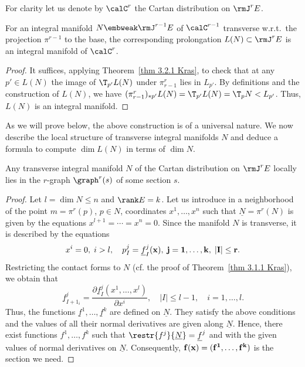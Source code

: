 For clarity let us denote by $\calC^r$ the Cartan distribution on $\rmJ^r E$.

\begin{cor}
    For an integral manifold $N\embweak\rmJ^{r-1}E$ of $\calC^{r-1}$ transverse w.r.t.\ the projection $\pi^{r-1}$ to the base, the corresponding prolongation $L(N)\subset \rmJ^rE$ is an integral manifold of $\calC^r$.
\end{cor}
\begin{proof}
    It suffices, applying Theorem~\ref{thm 3.2.1 Kras}, to check that at any $p'\in L(N)$ the image of $\T_{p'}L(N)$ under $\pi^r_{r-1}$ lies in $L_{p'}$. By definitions and the construction of $L(N)$, we have $(\pi^r_{r-1})_{\ast p'}L(N)=\T_{p'}L(N)=\T_pN< L_{p'}$. Thus, $L(N)$ is an integral manifold.
\end{proof}

As we will prove below, the above construction is of a universal nature. We now describe the local structure of transverse integral manifolds $N$ and deduce a formula to compute $\dim L(N)$ in terms of $\dim N$.

\begin{prop}\label{prop 3.2.4 Kras}
    Any transverse integral manifold $N$ of the Cartan distribution on $\rmJ^rE$ locally lies in the $r$-graph $\graph^r(s)$ of some section $s$.
\end{prop}
\begin{proof}
    Let $l=\dim N\leq n$ and $\rank E=k$. Let us introduce in a neighborhood of the point $m=\pi^r(p)$, $p\in N$, coordinates $x^1,\ldots,x^n$ such that $\underline{N}=\pi^r(N)$ is given by the equations $x^{l+1}=\cdots=x^n=0$. Since the manifold $N$ is transverse, it is described by the equations 
    \[x^i=0,\; i>l,\quad p^j_I=\underline f^j_I(\bf{x}),\; j=1,\ldots,k,\; |I|\leq r.\]
    Restricting the contact forms to $N$ (cf. the proof of Theorem~\ref{thm 3.1.1 Kras}), we obtain that 
    \[\underline f^j_{I+1_i}=\frac{\partial\underline f^j_I(x^1,\ldots,x^l)}{\partial x^i},\quad |I|\leq l-1,\quad i=1,\ldots,l.\]
    Thus, the functions $\underline f^1,\ldots,\underline f^k$ are defined on $\underline{N}$. They satisfy the above conditions and the values of all their normal derivatives are given along $\underline{N}$. Hence, there exist functions $f^1,\ldots,f^k$ such that $\restr{f^j}{\underline{N}}=\underline{f}^j$ and with the given values of normal derivatives on $\underline{N}$. Consequently, $\bf{f}(\bf{x})=(f^1,\ldots,f^k)$ is the section we need.
\end{proof}

